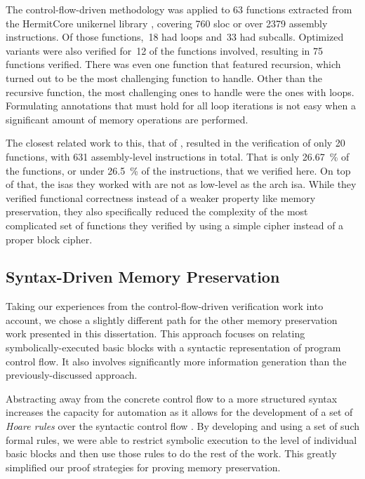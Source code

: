 The control-flow-driven methodology was applied to \num{63} functions extracted from the HermitCore \autocite{lankes2016hermitcore} unikernel library \autocite{madhavapeddy2014unikernels}, covering \num{760} \ac{sloc} or over \num{2379} assembly instructions.
Of those functions,~\num{18} had loops and~\num{33} had subcalls.
Optimized variants were also verified for~\num{12} of the functions involved, resulting in \num{75} functions verified.
There was even one function that featured recursion, which turned out to be the most challenging function to handle.
Other than the recursive function, the most challenging ones to handle were the ones with loops.
Formulating annotations that must hold for all loop iterations is not easy when a significant amount of memory operations are performed.

The closest related work to this, that of \textcite{matthews2006verification}, resulted in the verification of only \num{20} functions, with \num{631} assembly-level instructions in total.
That is only \SI{26.67}{\percent} of the functions, or under \SI{26.5}{\percent} of the instructions, that we verified here.
On top of that, the \acp{isa} they worked with are not as low-level as the \gls{arch} \ac{isa}.
While they verified functional correctness instead of a weaker property like memory preservation, they also specifically reduced the complexity of the most complicated set of functions they verified by using a simple  cipher instead of a proper block cipher.

\subsection{Syntax-Driven Memory Preservation}
Taking our experiences from the control-flow-driven verification work into account, we chose a slightly different path for the other memory preservation work presented in this dissertation.
This approach focuses on relating symbolically-executed basic blocks with a syntactic representation of program control flow.
It also involves significantly more information generation than the previously-discussed approach.

Abstracting away from the concrete control flow to a more structured syntax increases the capacity for automation as it allows for the development of a set of \emph{Hoare rules}
over the syntactic control flow \autocite{hoare1969axiomatic}.
By developing and using a set of such formal rules, we were able to restrict symbolic execution to the level of individual basic blocks and then use those rules to do the rest of the work.
This greatly simplified our proof strategies for proving memory preservation.

